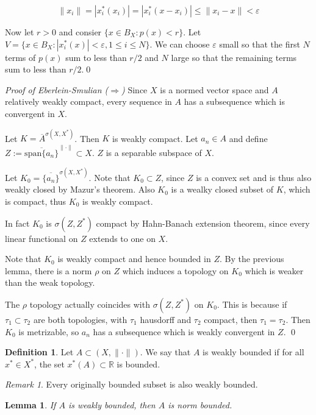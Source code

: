 \documentclass[11pt, reqno]{article}
\theoremstyle{plain}
\newtheorem*{lemma}{Lemma}
\theoremstyle{definition}
\newtheorem*{definition}{Definition}
\theoremstyle{remark}
\newtheorem*{remark}{Remark}
\renewcommand{\epsilon}{\varepsilon}
\newcommand{\RR}{\mathbb{R}}
\begin{document}
\[
    \|x_i\| = |x_i^*(x_i)| = |x_i^*(x - x_i)| \leq \|x_i - x\| < \epsilon
\]

Now let $r > 0$ and consier $\{x \in B_X: p(x) < r\}$. Let $V = \{x \in B_X: |x_i^*(x)| < \epsilon, 1 \leq i \leq N\}$.
We can choose $\epsilon$ small so that the first $N$ terms of $p(x)$ sum to less than $r/2$ and $N$ large 
so that the remaining terms sum to less than $r/2$.\hfill\qed

\bigbreak
\textit{Proof of Eberlein-Smulian ($\Rightarrow$)} Since $X$ is a normed vector space and $A$ relatively weakly compact, 
every sequence in $A$ has a subsequence which is convergent in $X$. 

Let $K = \overline{A}^{\sigma(X,X^*)}$. Then $K$ is weakly compact. Let $a_n \in A$ and define
$Z := \overline{\text{span}\{a_n\}}^{\|\cdot\|} \subset X$. $Z$ is a separable subspace of $X$. 

Let $K_0 = \overline{\{a_n\}}^{\sigma(X, X^*)}$. Note that $K_0 \subset Z$, since $Z$ is a convex
set and is thus also weakly closed by Mazur's theorem. Also $K_0$ is a wealky closed subset of $K$, which is 
compact, thus $K_0$ is weakly compact. 

In fact $K_0$ is $\sigma(Z, Z^*)$ compact by Hahn-Banach extension theorem, since every linear functional on 
$Z$ extends to one on $X$. 

Note that $K_0$ is weakly compact and hence bounded in $Z$. 
By the previous lemma, there is a norm $\rho$ on $Z$ which induces a topology on $K_0$ which is 
weaker than the weak topology. 

The $\rho$ topology actually coincides with $\sigma(Z, Z^*)$ on $K_0$. This is because if 
$\tau_1 \subset \tau_2$ are both topologies, with $\tau_1$ hausdorff and $\tau_2$ compact, then 
$\tau_1 = \tau_2$. Then $K_0$ is metrizable, so $a_n$ has a subsequence which is weakly convergent
in $Z$. \hfill\qed

\begin{definition}
    Let $A \subset (X, \|\cdot\|)$. We say that $A$ is weakly bounded if for all $x^* \in X^*$, 
    the set $x^*(A)\subset \RR$ is bounded.
\end{definition}

\begin{remark}
    Every originally bounded subset is also weakly bounded.
\end{remark}

\begin{lemma}
    If $A$ is weakly bounded, then $A$ is norm bounded.
\end{lemma}
\end{document}
